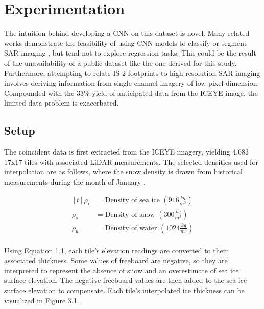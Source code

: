 \chapter{Experimentation}
\label{sec:Experimentation}

The intuition behind developing a CNN on this dataset is novel. Many related works demonstrate the feasibility of using CNN models to classify or segment SAR imaging \cite{SAR-U-Net}, but tend not to explore regression tasks. This could be the result of the unavailability of a public dataset like the one derived for this study. Furthermore, attempting to relate IS-2 footprints to high resolution SAR imaging involves deriving information from single-channel imagery of low pixel dimension. Compounded with the 33$\%$ yield of anticipated data from the ICEYE image, the limited data problem is exacerbated. 

\section{Setup}
The coincident data is first extracted from the ICEYE imagery, yielding 4,683 17x17 tiles with associated LiDAR measurements. The selected densities used for interpolation are as follows, where the snow density is drawn from historical measurements during the month of January \cite{warren1999snow}.

\begin{figure}[h]
  \[
  \begin{aligned}[t]
    \rho_i &=  \text{Density of sea ice }(916 \frac{kg}{m^3}) \\   %
    \rho_s &=  \text{Density of snow }(300 \frac{kg}{m^3}) \\   %
    \rho_w &=  \text{Density of water }(1024 \frac{kg}{m^3}) \\   %
  \end{aligned}
\]
\end{figure}
  
Using Equation 1.1, each tile's elevation readings are converted to their associated thickness. Some values of freeboard are negative, so they are interpreted to represent the absence of snow and an overestimate of sea ice surface elevation. The negative freeboard values are then added to the sea ice surface elevation to compensate. Each tile's interpolated ice thickness can be visualized in Figure 3.1.

